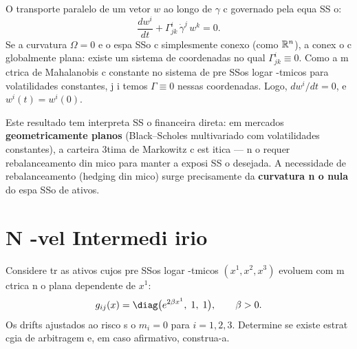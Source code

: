 \begin{sol}
O transporte paralelo de um vetor $w$ ao longo de $\gamma$ c governado pela equa SS o:
\begin{equation}
 \frac{dw^i}{dt} + \Gamma^i_{jk}\,\dot\gamma^j\,w^k = 0.
\end{equation}
Se a curvatura $\Omega=0$ e o espa SSo c simplesmente conexo (como $\mathbb{R}^n$), a conex o c globalmente plana: existe um sistema de coordenadas no qual $\Gamma^i_{jk}\equiv 0$. Como a m ctrica de Mahalanobis c constante no sistema de pre SSos logar -tmicos para volatilidades constantes, j i temos $\Gamma\equiv 0$ nessas coordenadas. Logo, $dw^i/dt = 0$, e $w^i(t) = w^i(0)$.

Este resultado tem interpreta SS o financeira direta: em mercados \textbf{geometricamente planos} (Black--Scholes multivariado com volatilidades constantes), a carteira 3tima de Markowitz c est itica --- n o requer rebalanceamento din mico para manter a exposi SS o desejada. A necessidade de rebalanceamento (hedging din mico) surge precisamente da \textbf{curvatura n o nula} do espa SSo de ativos.
\end{sol}

\section{N -vel Intermedi irio}
\label{sec:ex_intermediario}

\begin{exer}
\label{ex:arb_curvatura}
Considere tr as ativos cujos pre SSos logar -tmicos $(x^1,x^2,x^3)$ evoluem com m ctrica n o plana dependente de $x^1$:
\begin{equation}
 g_{ij}(x) = \diag\bigl(e^{2\beta x^1},\;1,\;1\bigr),\qquad \beta>0.
\end{equation}
Os drifts ajustados ao risco s o $m_i = 0$ para $i=1,2,3$. Determine se existe estrat cgia de arbitragem e, em caso afirmativo, construa-a.
\end{exer}

